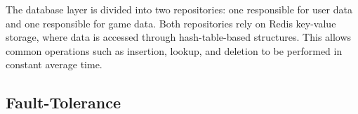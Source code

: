 \documentclass{scrartcl}
\begin{document}
  

  

The database layer is divided into two repositories: one responsible for user data and one responsible for game data. 
Both repositories rely on Redis key-value storage, where data is accessed through hash-table-based structures. 
This allows common operations such as insertion, lookup, and deletion to be performed in constant average time.

\subsection{Fault-Tolerance}\label{fault-tolerance}

  
\end{document}
